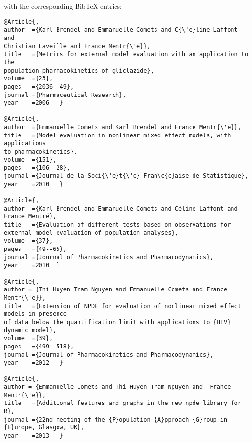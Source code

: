 \documentclass[12pt,a4paper]{article}
\begin{document}
with the corresponding BibTeX entries:
\begin{verbatim}
@Article{,
author	={Karl Brendel and Emmanuelle Comets and C{\'e}line Laffont and 
Christian Laveille and France Mentr{\'e}},
title	={Metrics for external model evaluation with an application to the
population pharmacokinetics of gliclazide},
volume	={23},
pages	={2036--49},
journal	={Pharmaceutical Research},
year	=2006	}

@Article{,
author	={Emmanuelle Comets and Karl Brendel and France Mentr{\'e}},
title	={Model evaluation in nonlinear mixed effect models, with applications
to pharmacokinetics},
volume	={151},
pages	={106--28},
journal	={Journal de la Soci{\'e}t{\'e} Fran\c{c}aise de Statistique},
year	=2010	}

@Article{,
author  ={Karl Brendel and Emmanuelle Comets and Céline Laffont and France Mentré},
title   ={Evaluation of different tests based on observations for external model evaluation of population analyses},
volume  ={37},
pages   ={49--65},
journal ={Journal of Pharmacokinetics and Pharmacodynamics},
year    =2010  }

@Article{,
author = {Thi Huyen Tram Nguyen and Emmanuelle Comets and France Mentr{\'e}},
title   ={Extension of NPDE for evaluation of nonlinear mixed effect models in presence
of data below the quantification limit with applications to {HIV} dynamic model},
volume	={39},
pages	={499--518},
journal ={Journal of Pharmacokinetics and Pharmacodynamics},
year    =2012	}

@Article{,
author = {Emmanuelle Comets and Thi Huyen Tram Nguyen and  France Mentr{\'e}},
title   ={Additional features and graphs in the new npde library for R},
journal ={22nd meeting of the {P}opulation {A}pproach {G}roup in {E}urope, Glasgow, UK},
year    =2013	}


\end{verbatim}



\clearpage


\clearpage


\clearpage


\clearpage
\newpage
{}




\end{document}
